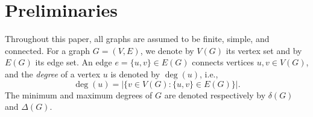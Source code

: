\documentclass[letterpaper,12pt]{article}
\begin{document}



 

\section{Preliminaries}\label{sec:preliminaries}

Throughout this paper, all graphs are assumed to be finite, simple, and connected.  
For a graph \(G = (V,E)\), we denote by \(V(G)\) its vertex set and by \(E(G)\) its edge set.  
An edge \(e = \{u,v\} \in E(G)\) connects vertices \(u,v \in V(G)\), and the \emph{degree} of a vertex \(u\) is denoted by \(\deg(u)\), i.e.,
\[
\deg(u) = |\{ v \in V(G) : \{u,v\} \in E(G)\}|.
\]
The minimum and maximum degrees of \(G\) are denoted respectively by \(\delta(G)\) and \(\Delta(G)\).
\end{document}
